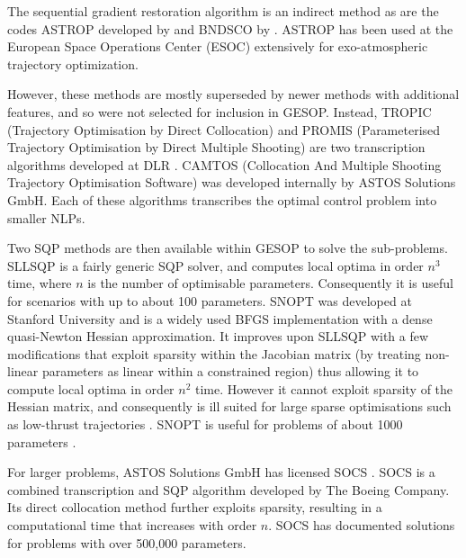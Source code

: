 The sequential gradient restoration algorithm \parencite[SGRA, ][]{Miele1975} is an indirect method as are the codes ASTROP developed by \textcite{Bartholomew-Biggs1988} and BNDSCO by \textcite{Bulirsch1971}. ASTROP has been used at the European Space Operations Center (ESOC) extensively for exo-atmospheric trajectory optimization. 

However, these methods are mostly superseded by newer methods with additional features, and so were not selected for inclusion in GESOP. Instead, TROPIC (Trajectory Optimisation by Direct Collocation) and PROMIS (Parameterised Trajectory Optimisation by Direct Multiple Shooting) are two transcription algorithms developed at DLR \parencite{Jansch1990}. %
CAMTOS (Collocation And Multiple Shooting Trajectory Optimisation Software) was developed internally by ASTOS Solutions GmbH. Each of these algorithms transcribes the optimal control problem into smaller NLPs. 

Two SQP methods are then available within GESOP to solve the sub-problems. SLLSQP is a fairly generic SQP solver, and computes local optima in order $n^{3}$ time, where $n$ is the number of optimisable parameters. Consequently it is useful for scenarios with up to about 100 parameters. SNOPT \parencite[Sparse Nonlinear Optimizer, ][]{Gill1997} was developed at Stanford University and is a widely used BFGS implementation with a dense quasi-Newton Hessian approximation. It improves upon SLLSQP with a few modifications that exploit sparsity within the Jacobian matrix (by treating non-linear parameters as linear within a constrained region) thus allowing it to compute local optima in order $n^{2}$ time. However it cannot exploit sparsity of the Hessian matrix, and consequently is ill suited for large sparse optimisations such as low-thrust trajectories \parencite{Betts2002}. SNOPT is useful for problems of about 1000 parameters \parencite{ASTOS_guide}.

For larger problems, ASTOS Solutions GmbH has licensed SOCS \parencite[Sparse Optimal Control Software, ][]{SOCS_guide}. SOCS is a combined transcription and SQP algorithm developed by The Boeing Company. Its direct collocation method further exploits sparsity, resulting in a computational time that increases with order $n$. SOCS has documented solutions for problems with over 500,000 parameters.

